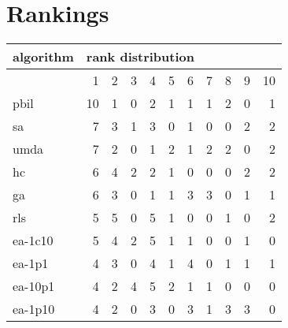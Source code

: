 \graphicspath{{../graphics/}}

\section{Rankings}
\begin{center}
\begin{tabular}{@{}l*{10}{r}@{}}
\toprule
algorithm & \multicolumn{10}{l}{{rank distribution}}\\
\midrule
& 1 & 2 & 3 & 4 & 5 & 6 & 7 & 8 & 9 & 10\\
\midrule
pbil & 10 & 1 & 0 & 2 & 1 & 1 & 1 & 2 & 0 & 1\\
sa & 7 & 3 & 1 & 3 & 0 & 1 & 0 & 0 & 2 & 2\\
umda & 7 & 2 & 0 & 1 & 2 & 1 & 2 & 2 & 0 & 2\\
hc & 6 & 4 & 2 & 2 & 1 & 0 & 0 & 0 & 2 & 2\\
ga & 6 & 3 & 0 & 1 & 1 & 3 & 3 & 0 & 1 & 1\\
rls & 5 & 5 & 0 & 5 & 1 & 0 & 0 & 1 & 0 & 2\\
ea-1c10 & 5 & 4 & 2 & 5 & 1 & 1 & 0 & 0 & 1 & 0\\
ea-1p1 & 4 & 3 & 0 & 4 & 1 & 4 & 0 & 1 & 1 & 1\\
ea-10p1 & 4 & 2 & 4 & 5 & 2 & 1 & 1 & 0 & 0 & 0\\
ea-1p10 & 4 & 2 & 0 & 3 & 0 & 3 & 1 & 3 & 3 & 0\\
\bottomrule
\end{tabular}
\end{center}

\newpage

